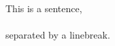 \documentclass{article}
\begin{document}
\noindent
\paragraph{}
This is a sentence,
\paragraph{}
separated by a linebreak.
\end{document}
